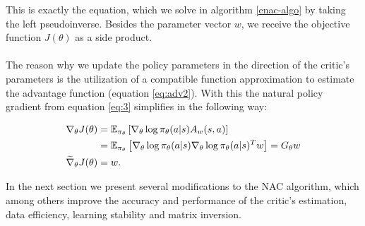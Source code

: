 \noindent This is exactly the equation, which we solve in algorithm \ref{enac-algo} by taking the left pseudoinverse. Besides the parameter vector $w$, we receive the objective function $J(\theta)$ as a side product.
\\\\
 The reason why we update the policy parameters in the direction of the critic's parameters is the utilization of a compatible function approximation to estimate the advantage function (equation \ref{eq:adv2}). With this the natural policy gradient from equation \ref{eq:3} simplifies in the following way:

\begin{align}
\nabla_\theta J(\theta) &= \operatorname{\mathbb{E}}_{\pi_{\theta}} \left[\nabla_{\theta} \log \pi_{\theta}(a|s) A_w(s, a)\right]\\
&= \operatorname{\mathbb{E}}_{\pi_{\theta}}  \left[\nabla_{\theta} \log \pi_{\theta}(a|s) \nabla_{\theta} \log \pi_{\theta}(a|s)^T w\right]
= G_\theta w\\
\widetilde{\nabla}_{\theta} J(\theta) &= w.
\end{align}

\noindent In the next section we present several modifications to the NAC algorithm, which among others improve the accuracy and performance of the critic's estimation, data efficiency, learning stability and matrix inversion.

